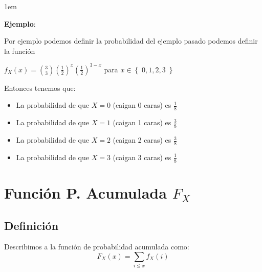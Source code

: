 \documentclass[12pt, fleqn]{report}                             %
\newenvironment{SmallIndentation}[1][0.75em]                    %
        {\begin{adjustwidth}{#1}{}\begin{footnotesize}}             %
        {\end{footnotesize}\end{adjustwidth}}                       %
\theoremstyle{break}                                            %
\newcommand{\Set}[1]            {\left\{ \; #1 \; \right\}}     %
\newcommand{\Wrap}[1]           {\left( #1 \right)}             %
\begin{document}
            \begin{SmallIndentation}[1em]
                \textbf{Ejemplo}:
                
                Por ejemplo podemos definir la probabilidad del ejemplo pasado
                podemos definir la función

                $f_{X}(x) = {3 \choose 3} \Wrap{\frac{1}{2}}^x \Wrap{\frac{1}{2}}^{3-x}$ 
                para $x \in \Set{0, 1, 2, 3}$

                Entonces tenemos que:
                \begin{itemize}
                    \item La probabilidad de que $X = 0$ (caigan 0 caras) es $\frac{1}{8}$ 
                    \item La probabilidad de que $X = 1$ (caigan 1 caras) es $\frac{3}{8}$ 
                    \item La probabilidad de que $X = 2$ (caigan 2 caras) es $\frac{3}{8}$ 
                    \item La probabilidad de que $X = 3$ (caigan 3 caras) es $\frac{1}{8}$ 
                \end{itemize}
            
            \end{SmallIndentation}


        \clearpage
        \section{Función P. Acumulada $F_X$}

            \subsection{Definición}

                Describimos a la función de probabilidad acumulada como:
                \begin{equation*}
                    F_X(x) = \sum_{i \leq x} f_{X}(i)
                \end{equation*}
\end{document}
